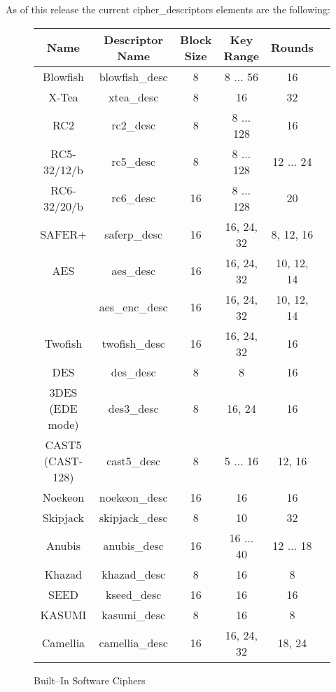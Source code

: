 \documentclass[synpaper]{book}
\begin{document}
As of this release the current cipher\_descriptors elements are the following:
\vfil
{}
       
         
\begin{figure}[hpbt]
\begin{small}
\begin{center}
\begin{tabular}{|c|c|c|c|c|c|}
     \hline \textbf{Name} & \textbf{Descriptor Name} & \textbf{Block Size} & \textbf{Key Range} & \textbf{Rounds} \\
     \hline Blowfish & blowfish\_desc & 8 & 8 $\ldots$ 56 & 16 \\
     \hline X-Tea & xtea\_desc & 8 & 16 & 32 \\
     \hline RC2 & rc2\_desc & 8 & 8 $\ldots$ 128 & 16 \\
     \hline RC5-32/12/b & rc5\_desc & 8 & 8 $\ldots$ 128 & 12 $\ldots$ 24 \\
     \hline RC6-32/20/b & rc6\_desc & 16 & 8 $\ldots$ 128 & 20 \\
     \hline SAFER+ & saferp\_desc &16 & 16, 24, 32 & 8, 12, 16 \\
     \hline AES & aes\_desc & 16 & 16, 24, 32 & 10, 12, 14 \\
                & aes\_enc\_desc & 16 & 16, 24, 32 & 10, 12, 14 \\
     \hline Twofish & twofish\_desc & 16 & 16, 24, 32 & 16 \\
     \hline DES & des\_desc & 8 & 8 & 16 \\
     \hline 3DES (EDE mode) & des3\_desc & 8 & 16, 24 & 16 \\
     \hline CAST5 (CAST-128) & cast5\_desc & 8 & 5 $\ldots$ 16 & 12, 16 \\
     \hline Noekeon & noekeon\_desc & 16 & 16 & 16 \\
     \hline Skipjack & skipjack\_desc & 8 & 10 & 32 \\
     \hline Anubis & anubis\_desc & 16 & 16 $\ldots$ 40 & 12 $\ldots$ 18 \\
     \hline Khazad & khazad\_desc & 8 & 16 & 8 \\
     \hline SEED   & kseed\_desc & 16 & 16 & 16 \\
     \hline KASUMI & kasumi\_desc & 8 & 16 & 8 \\
     \hline Camellia & camellia\_desc & 16 & 16, 24, 32 & 18, 24 \\
     \hline
\end{tabular}
\end{center}
\end{small}
\caption{Built--In Software Ciphers}
\end{figure}
\end{document}
